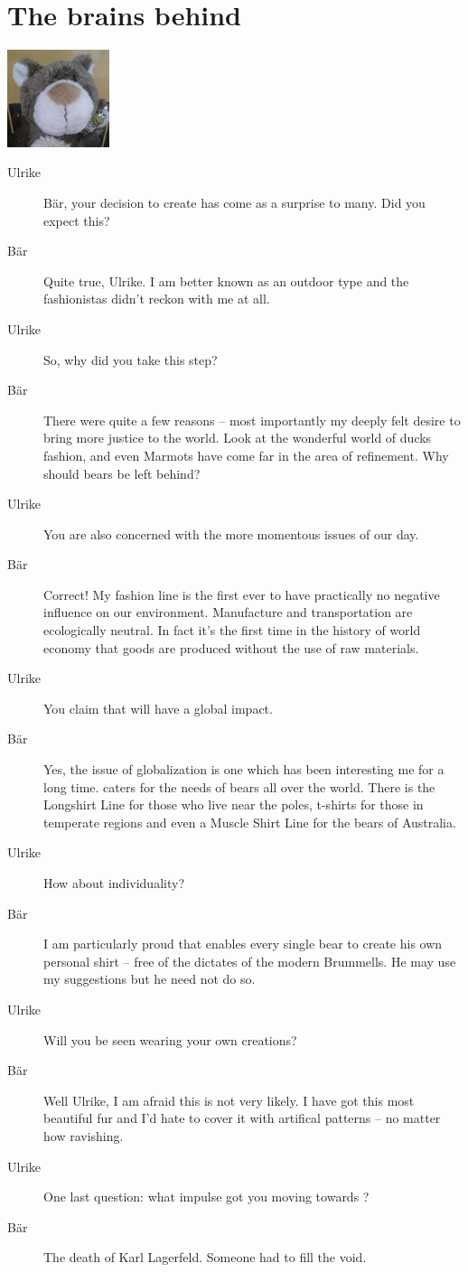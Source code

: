  \section{The brains behind \bearwearlogo{}}
 \includegraphics[width=3cm]{baer}
 \begin{description}
 \item[Ulrike]
  Bär, your decision to create \bearwearlogo{} has come as a surprise to many. Did you expect this?
  \item[Bär] Quite true, Ulrike. I am better known as an outdoor type
  and the fashionistas didn't reckon with me at all.
 \item[Ulrike] So, why did you take this step?
 \item[Bär] There were quite a few reasons -- most importantly
 my deeply felt desire to bring more justice to the world.
 Look at the wonderful world of \TikZ ducks fashion, and even Marmots have come
 far in the area of refinement. Why should \TikZ bears be left behind?
 \item[Ulrike] You are also concerned with the more momentous issues of our day.
 \item[Bär] Correct! My fashion line is the first ever to have practically
 no negative influence on our environment. Manufacture and transportation
 are ecologically neutral. In fact it's the first time in the
 history of world economy that goods are produced without
 the use of raw materials.
 \item[Ulrike] You claim that \bearwearlogo{} will have a global impact.
 \item[Bär] Yes, the issue of globalization is one which has been interesting
  me for a long time. \bearwearlogo{} caters for the needs of \TikZ bears all
  over the world. There is the Longshirt Line for those who live near the poles,
  t-shirts for those in temperate regions and even a Muscle Shirt Line for the
  bears of Australia.
 \item[Ulrike] How about individuality?
 \item[Bär] I am particularly proud that \bearwearlogo{} enables every single
 bear to create his own personal shirt -- free of the dictates of the modern
 Brummells. He may use my suggestions but he need not do so.
 \item[Ulrike] Will you be seen wearing your own creations?
 \item[Bär] Well Ulrike, I am afraid this is not very likely.
 I have got this most beautiful fur and I'd hate to  cover it with artifical
 patterns -- no matter how ravishing.
 \item[Ulrike] One last question: what impulse got you moving towards
 \bearwearlogo{}?
 \item[Bär] The death of Karl Lagerfeld. Someone had to fill the void.
 \end{description}
